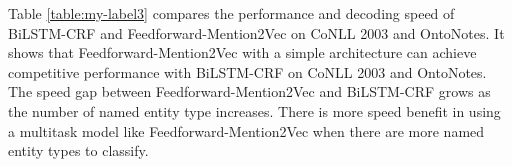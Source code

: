 Table \ref{table:my-label3} compares the performance and decoding speed of BiLSTM-CRF and Feedforward-Mention2Vec on CoNLL 2003 and OntoNotes. It shows that Feedforward-Mention2Vec with a simple architecture can achieve competitive performance with BiLSTM-CRF on CoNLL 2003 and OntoNotes. The speed gap between Feedforward-Mention2Vec and BiLSTM-CRF grows as the number of named entity type increases. There is more speed benefit in using a multitask model like Feedforward-Mention2Vec when there are more named entity types to classify. 



